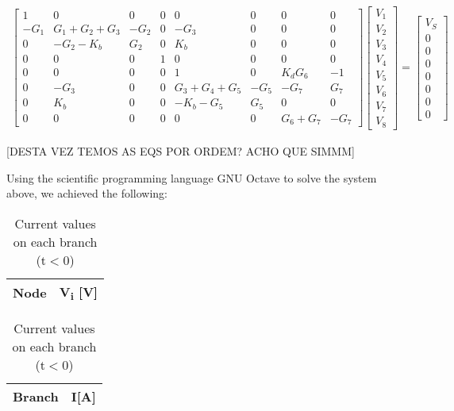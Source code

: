 \begin{gather}
\begin{bmatrix}
1 & 0 & 0 & 0 & 0 & 0 & 0 & 0\\
-G_1 & G_1+G_2+G_3 & -G_2& 0 & -G_3 & 0 & 0 & 0\\
0 & -G_2-K_b & G_2 & 0 & K_b & 0 & 0 & 0\\
0 & 0 & 0 & 1 & 0 & 0 & 0 & 0\\
0 & 0 & 0 & 0 & 1 & 0 & K_d G_6 & -1\\
0 & -G_3 & 0 & 0 & G_3+G_4+G_5 & -G_5 & -G_7 & G_7\\
0 & K_b & 0 & 0 & -K_b-G_5 & G_5 & 0 & 0\\
0 & 0 & 0 & 0 & 0 & 0 & G_6+G_7 & -G_7
\end{bmatrix}
\begin{bmatrix}
 V_1\\
 V_2\\
 V_3\\
 V_4\\
 V_5\\
 V_6\\
 V_7\\
 V_8
\end{bmatrix}
=
\begin{bmatrix}
 V_S\\
 0\\
 0\\
 0\\
 0\\
 0\\
 0\\
 0
\end{bmatrix}
\end{gather}

[DESTA VEZ TEMOS AS EQS POR ORDEM? ACHO QUE SIMMM]

Using the scientific programming language GNU Octave to solve the system above, we achieved the following:


\begin{table}[!htb]
    \begin{minipage}{.5\linewidth}
      
      \centering
        \begin{tabular}{|c|c|}
        \hline    
        {\bf Node} & {\bf V\textsubscript{i} [V]} \\ \hline
        
        \end{tabular}
        \caption{Voltage values on each node (t$<$0)}
    \end{minipage}%
    \begin{minipage}{.5\linewidth}
      \centering
        
        \begin{tabular}{|c|c|}
        \hline    
        {\bf Branch} & {\bf I[A]} \\ \hline
        
        \end{tabular}
        \caption{Current values on each branch (t$<$0)}
    \end{minipage} 
\end{table}

